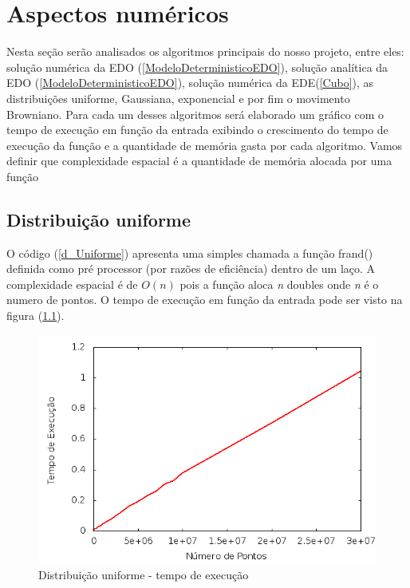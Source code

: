 \chapter{Aspectos numéricos}
Nesta seção serão analisados os algoritmos principais do nosso projeto, entre eles: solução numérica da EDO (\ref{ModeloDeterministicoEDO}), solução analítica da EDO (\ref{ModeloDeterministicoEDO}), solução numérica da EDE(\ref{Cubo}), as distribuições uniforme, Gaussiana, exponencial e por fim o movimento Browniano. Para cada um desses algoritmos será elaborado um gráfico com o tempo de execução em função da entrada exibindo o crescimento do tempo de execução da função e a quantidade de memória gasta por cada algoritmo. Vamos definir que complexidade espacial é a quantidade de memória alocada por uma função

\section{Distribuição uniforme}
O código (\ref{d_Uniforme}) apresenta uma simples chamada a função frand() definida como pré processor (por razões de eficiência) dentro de um laço. A complexidade espacial é de $O(n)$ pois a função aloca \textit{n} doubles onde \textit{n} é o numero de pontos. O tempo de execução em função da entrada pode ser visto na figura (\ref{TempExecUniforme}).
\begin{figure}[!htb]
\centering
\begin{minipage}[b]{0.45\linewidth}
\includegraphics[width=\linewidth]{./img/AspectosNumericos/UniComplexidade.png}
\caption{Distribuição uniforme - tempo de execução}
\label{TempExecUniforme}
\end{minipage} \hfill
\end{figure}


